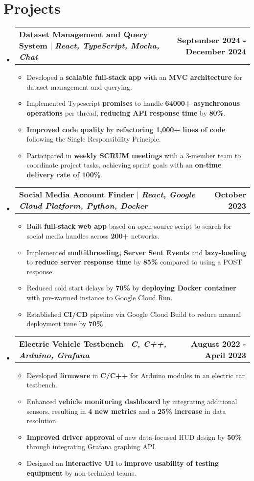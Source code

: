 \documentclass[letterpaper,11pt]{article}
\makeatletter
\newcommand{\bluey}[1]{{\color{customblue}#1}}
\newcommand{\resumeItem}[1]{
  \item\small{
    {#1 \vspace{-2pt}}
  }
}
\newcommand{\resumeProjectHeading}[2]{
    \item
    \begin{tabular*}{1.001\textwidth}{l@{\extracolsep{\fill}}r}
      \small#1 & \textbf{\small #2}\\
    \end{tabular*}\vspace{-7pt}
}
\newcommand{\resumeSubHeadingListStart}{\begin{itemize}[leftmargin=0.0in, label={}]}
\newcommand{\resumeSubHeadingListEnd}{\end{itemize}}
\newcommand{\resumeItemListStart}{\begin{itemize}}
\newcommand{\resumeItemListEnd}{\end{itemize}\vspace{-5pt}}
\makeatother
\begin{document}
\section{Projects}
    \vspace{-5pt}
    \resumeSubHeadingListStart
      \resumeProjectHeading
          {\textbf{\bluey{Dataset Management and Query System}} $|$ \emph{\textbf{React, TypeScript, Mocha, Chai}}}{September 2024 - December 2024}
          \resumeItemListStart
            \resumeItem{Developed a \textbf{scalable full-stack app} with an \textbf{MVC architecture} for dataset management and querying.}
            \resumeItem{Implemented Typescript \textbf{promises} to handle \textbf{64000+ asynchronous operations} per thread, \textbf{reducing API response time} by \textbf{80\%}.}
            \resumeItem{\textbf{Improved code quality} by \textbf{refactoring 1,000+ lines of code} following the Single Responsibility Principle.}
            \resumeItem{Participated in \textbf{weekly SCRUM meetings} with a 3-member team to coordinate project tasks, achieving sprint goals with an \textbf{on-time delivery rate of 100\%}.}
          \resumeItemListEnd 
          \vspace{-13pt}
      \resumeProjectHeading
          {\textbf{\bluey{Social Media Account Finder}} $|$ \emph{ \textbf{React, Google Cloud Platform, Python, Docker}}}{October 2023}
          \resumeItemListStart
            \resumeItem{Built \textbf{full-stack web app} based on open source script to search for social media handles across \textbf{200+} networks.}
            \resumeItem{Implemented \textbf{multithreading, Server Sent Events} and \textbf{lazy-loading} to \textbf{reduce server response time} by \textbf{85\%} compared to using a POST response.}
            \resumeItem{Reduced cold start delays by \textbf{70\%} by \textbf{deploying Docker container} with pre-warmed instance to Google Cloud Run.}
          \resumeItem{Established \textbf{CI/CD} pipeline via Google Cloud Build to reduce manual deployment time by \textbf{70\%}.}
        \resumeItemListEnd
        \vspace{-13pt}
      \resumeProjectHeading
          {\textbf{\bluey{Electric Vehicle Testbench}} $|$ \emph{\textbf{C, C++, Arduino, Grafana}}}{August 2022 - April 2023}
          \resumeItemListStart
            \resumeItem{Developed \textbf{firmware} in \textbf{C/C++} for Arduino modules in an electric car testbench.}
            \resumeItem{Enhanced \textbf{vehicle monitoring dashboard} by integrating additional sensors, resulting in \textbf{4 new metrics} and a \textbf{25\% increase} in data resolution.}
            \resumeItem{\textbf{Improved driver approval} of new data-focused HUD design by \textbf{50\%} through integrating Grafana graphing API.}
            \resumeItem{Designed an \textbf{interactive UI} to \textbf{improve usability of testing equipment} by non-technical teams.}            
          \resumeItemListEnd 
    \resumeSubHeadingListEnd
\vspace{-15pt}
\end{document}

